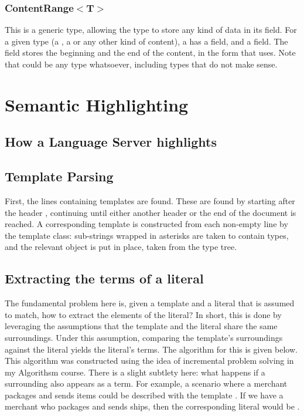\documentclass[../main.tex]{subfiles}
\begin{document}
\subsubsection{ContentRange$<$T$>$}
This is a generic type, allowing the type to store any kind of data in its field. For a given type  (a , a  or any other kind of content), a  has a  field, and a  field. The  field stores the beginning and the end of the content, in the  form that  uses. Note that  could be any type whatsoever, including types that do not make sense.
%
%
%
\section{Semantic Highlighting}
\subsection{How a Language Server highlights}

\subsection{Template Parsing}
First, the lines containing templates are found. These are found by starting after the header , continuing until either another header or the end of the document is reached. A corresponding template is constructed from each non-empty line by the template class: sub-strings wrapped in asterisks are taken to contain types, and the relevant  object is put in place, taken from the type tree.

\subsection{Extracting the terms of a literal}
The fundamental problem here is, given a template  and a literal  that is assumed to match, how to extract the elements of the literal? In short, this is done by leveraging the assumptions that the template and the literal share the same surroundings. Under this assumption, comparing the template's surroundings against the literal yields the literal's terms. The algorithm for this is given below.
This algorithm was constructed using the idea of incremental problem solving in my Algorithsm course.
There is a slight subtlety here: what happens if a surrounding also appears as a term. For example, a scenario where a merchant packages and sends items could be described with the template . If we have a merchant who packages and sends ships, then the corresponding literal would be .
\end{document}
